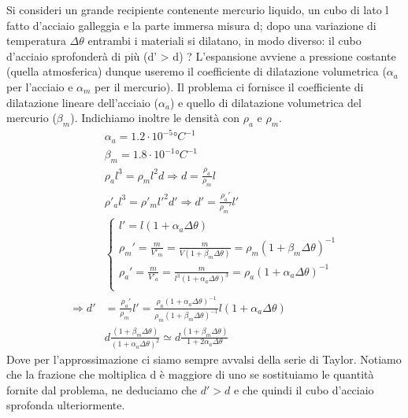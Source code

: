 \documentclass[
10pt, %
a4paper, %
oneside, %
headinclude,footinclude, %
BCOR5mm, %
]{scrartcl}
\begin{document}
\begin{exercise}
	Si consideri un grande recipiente contenente mercurio liquido, un cubo di lato l fatto d'acciaio galleggia e la parte immersa misura d; dopo una variazione di temperatura $\Delta \theta$ entrambi i materiali si dilatano, in modo diverso: il cubo d'acciaio sprofonderà di più (d' > d) ? L'espansione avviene a pressione costante (quella atmosferica) dunque useremo il coefficiente di dilatazione volumetrica ($\alpha_a$ per l'acciaio e $\alpha_m$ per il mercurio). Il problema ci fornisce il coefficiente di dilatazione lineare dell'acciaio ($\alpha_a$) e quello di dilatazione volumetrica del mercurio ($\beta_m$). Indichiamo inoltre le densità con $\rho_a$ e $\rho_m$.
	\begin{align*} 
		&\alpha_a = 1.2 \cdot 10^{-5} °C^{-1}\\
		&\beta_m = 1.8 \cdot 10^{-1} °C^{-1}\\
		&\rho_a l^3 = \rho_m l^2 d \Rightarrow d = \frac{\rho_a}{\rho_m} l\\
		&\rho'_a l^3 = \rho'_m l'^2 d' \Rightarrow d' = \frac{\rho_a'}{\rho_m'} l'\\
		&\begin{cases}
			l' = l (1 + \alpha_a \Delta \theta)\\
			\rho_m' = \frac{m }{V'_m} = \frac{m}{V (1 + \beta_m \Delta \theta)} = \rho_m (1 + \beta_m \Delta \theta)^{-1}\\
			\rho_a' = \frac{m }{V'_a} = \frac{m}{l^3 (1 + \alpha_a \Delta \theta)^3} = \rho_a (1 + \alpha_a \Delta \theta)^{-1}\\
		\end{cases}\\
		\Rightarrow d' &= \frac{\rho_a'}{\rho_m'} l' = \frac{\rho_a (1 + \alpha_a \Delta \theta)^{-1}}{\rho_m (1 + \beta_m \Delta \theta)^{-1}} l (1 + \alpha_a \Delta \theta)\\
		&d \frac{(1 + \beta_m \Delta \theta)}{(1 + \alpha_a \Delta \theta)^2}\simeq d \frac{(1 + \beta_m  \Delta \theta)}{1+2 \alpha_a \Delta \theta}
	\end{align*}  
	Dove per l'approssimazione ci siamo sempre avvalsi della serie di Taylor. Notiamo che la frazione che moltiplica d è maggiore di uno se sostituiamo le quantità fornite dal problema, ne deduciamo che $d' > d$ e che quindi il cubo d'acciaio sprofonda ulteriormente. 
\end{exercise} 
\end{document}
